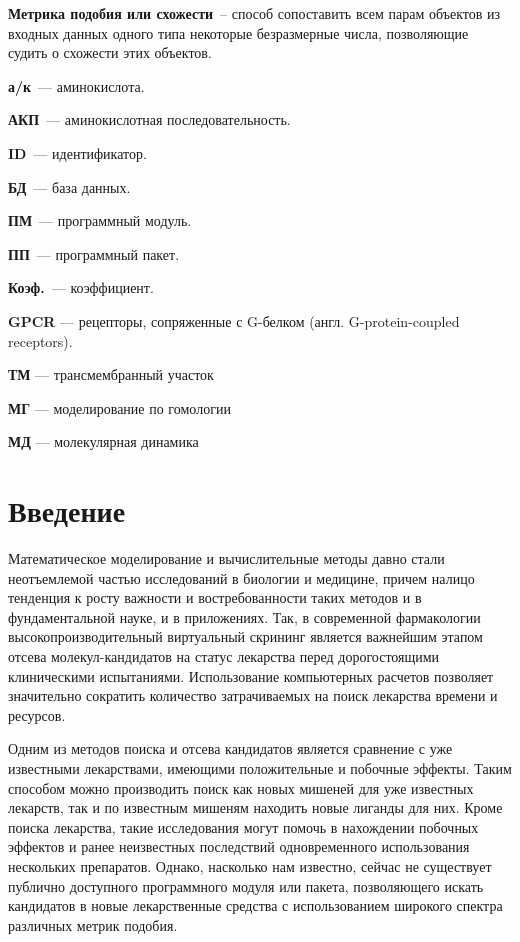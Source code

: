 \documentclass[a4paper,14pt]{article}         %
\begin{document}
\textbf{Метрика подобия или схожести}~-- способ сопоставить всем парам объектов из входных данных одного типа некоторые безразмерные числа, позволяющие судить о схожести этих объектов.

\textbf{а/к}~--- аминокислота.

\textbf{АКП}~--- аминокислотная последовательность.

\textbf{ID}~--- идентификатор.

\textbf{БД}~--- база данных.

\textbf{ПМ}~--- программный модуль.

\textbf{ПП}~--- программный пакет.

\textbf{Коэф.}~--- коэффициент.

\textbf{GPCR} --- рецепторы, сопряженные с G-белком (англ. G-protein-coupled receptors).

\color{gray}
\textbf{ТМ} --- трансмембранный участок

\textbf{МГ} --- моделирование по гомологии

\textbf{МД} --- молекулярная динамика
\color{black}

\newpage
\section{Введение}
Математическое моделирование и вычислительные методы давно стали неотъемлемой частью исследований в биологии и медицине, причем налицо тенденция к росту важности и востребованности таких методов и в фундаментальной науке, и в приложениях. Так, в современной фармакологии высокопроизводительный виртуальный скрининг является важнейшим этапом отсева молекул-кандидатов на статус лекарства перед дорогостоящими клиническими испытаниями. Использование компьютерных расчетов позволяет значительно сократить количество затрачиваемых на поиск лекарства времени и ресурсов.

Одним из методов поиска и отсева кандидатов является сравнение с уже известными лекарствами, имеющими положительные и побочные эффекты. Таким способом можно производить поиск как новых мишеней для уже известных лекарств, так и по известным мишеням находить новые лиганды для них. Кроме поиска лекарства, такие исследования могут помочь в нахождении побочных эффектов и ранее неизвестных последствий одновременного использования нескольких препаратов. Однако, насколько нам известно, сейчас не существует публично доступного программного модуля или пакета, позволяющего искать кандидатов в новые лекарственные средства с использованием широкого спектра различных метрик подобия.
\end{document}
